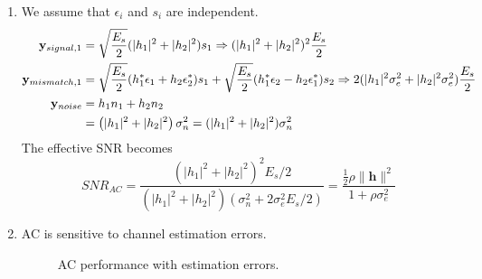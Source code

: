 \documentclass[12pt]{article}
\begin{document}
\begin{enumerate}
\item We assume that $\epsilon_i$ and $s_i$ are independent.
\begin{equation*}
\begin{split}
{\bf y}_{signal,1} & =  \sqrt{\frac{E_s}{2}}(|h_1|^2 + |h_2|^2)s_1 \Rightarrow (|h_1|^2 + |h_2|^2)^2 \frac{E_s}{2} \\
{\bf y}_{mismatch,1} & = \sqrt{\frac{E_s}{2}}(h_1^* \epsilon_1 +
h_2 \epsilon_2^*)s_1 + \sqrt{\frac{E_s}{2}}( h_1^* \epsilon_2 -
h_2 \epsilon_1^*) s_2 \Rightarrow 2(
|h_1|^2 \sigma_e^2 + |h_2|^2 \sigma_e^2 ) \frac{E_s}{2} \\
{\bf y}_{noise} & = h_1n_1 + h_2n_2
\\
& = \left(|h_1|^2+|h_2|^2 \right) \sigma_n^2 = ( |h_1|^2 +|h_2|^2) \sigma_n^2
\end{split}
\end{equation*}
The effective SNR becomes
\begin{equation*}
SNR_{AC} = \frac{(|h_1|^2 + |h_2|^2)^2 E_s/2}{(|h_1|^2 +
|h_2|^2)(\sigma_n^2 + 2 \sigma_e^2 E_s/2)} = \frac{ \frac{1}{2} \rho \lVert \mathbf h \rVert^2}{ 1 + \rho \sigma_e^2 }
\end{equation*}
\item AC is sensitive to channel estimation errors.
\begin{figure} [hhh]
\vspace{3mm}
\centerline{}
\caption{ {AC performance with estimation errors.}} \label{fig:ac_est}
\end{figure}

\end{enumerate}
\end{document}
